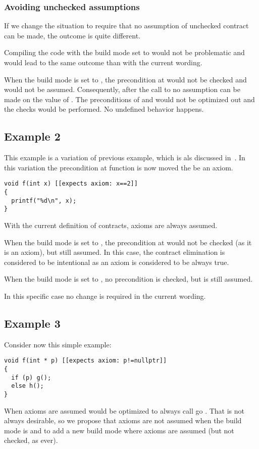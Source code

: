 \subsubsection{Avoiding unchecked assumptions}

If we change the situation to require that no assumption of unchecked contract
can be made, the outcome is quite different.

Compiling the code with the build mode set to  would not be
problematic and would lead to the same outcome than with the current wording.

When the build mode is set to , the precondition at
 would not be checked and would not be assumed. Consequently, after
the call to  no assumption can be made on the value of
. The preconditions of  and  would not be
optimized out and the checks would be performed. No undefined behavior happens.

\subsection{Example 2}

This example is a variation of previous example, which is als discussed
in~\cite{p1321r0}. In this variation the precondition at function  is
now moved the be an axiom.

\begin{lstlisting}
void f(int x) [[expects axiom: x==2]]
{
  printf("%d\n", x);
}
\end{lstlisting}

With the current definition of contracts, axioms are always assumed.

When the build mode is set to , the precondition at
 would not be checked (as it is an axiom), but still assumed.
In this case, the contract elimination is considered to be intentional as
an axiom is considered to be always true.

When the build mode is set to , no precondition is checked, but
 is still assumed. 

In this specific case no change is required in the current wording.


\subsection{Example 3}

Consider now this simple example:

\begin{lstlisting}
void f(int * p) [[expects axiom: p!=nullptr]]
{
  if (p) g();
  else h();
}
\end{lstlisting}

When axioms are assumed  would be optimized to always call go
. 
That is not always desirable, so we propose that axioms are not assumed when
the build mode is  and to add a new build mode 
where axioms are assumed (but not checked, as ever).

